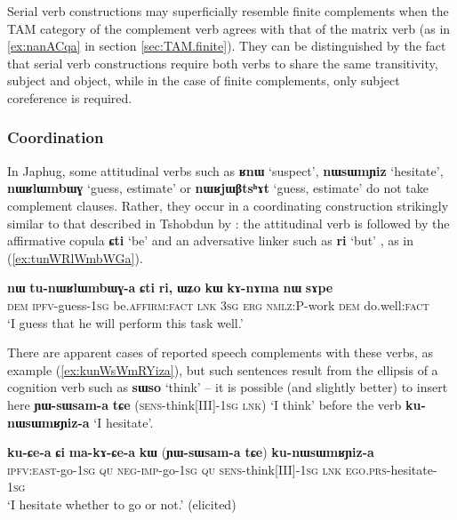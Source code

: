 \documentclass[oneside,a4paper,11pt]{article}
\newcommand{\ipa}[1]{\textbf{\phon#1}} %
\newcommand{\jpg}[2]{\ipa{#1} `#2'} %
\begin{document}
Serial verb constructions may superficially resemble finite complements when the TAM category of the complement verb agrees with that of the matrix verb (as in \ref{ex:nanACqa} in section \ref{sec:TAM.finite}). They can be distinguished by the fact that serial verb constructions require both verbs to share the same transitivity, subject and object, while in the case of finite complements, only subject coreference is required.

\subsubsection{Coordination}
In Japhug, some attitudinal verbs such as \jpg{ʁnɯ}{suspect}, \jpg{nɯsɯmɲiz}{hesitate}, \jpg{nɯʁlɯmbɯɣ}{guess, estimate} or \jpg{nɯʁjɯβtsʰɤt}{guess, estimate} do not take complement clauses. Rather, they occur in a coordinating construction strikingly similar to that described in Tshobdun  by \citet[487-8]{sun12complementation}: the attitudinal verb is followed by the affirmative copula \jpg{ɕti}{be} and an adversative linker such as \jpg{ri}{but} , as in (\ref{ex:tunWRlWmbWGa}).

\begin{exe}
\ex \label{ex:tunWRlWmbWGa}
\gll \ipa{nɯ} 	\ipa{tu-nɯʁlɯmbɯɣ-a} 	\ipa{ɕti} 	\ipa{ri,} 	\ipa{ɯʑo} 	\ipa{kɯ} 	\ipa{kɤ-nɤma} 	\ipa{nɯ} 	\ipa{sɤpe} \\
\textsc{dem} \textsc{ipfv}-guess-\textsc{1sg} be.\textsc{affirm:fact} \textsc{lnk} \textsc{3sg} \textsc{erg} \textsc{nmlz:P}-work \textsc{dem} do.well:\textsc{fact} \\
\glt `I guess that he will perform this task well.'
\end{exe}

There are apparent cases of reported speech complements with these verbs, as example (\ref{ex:kunWsWmRYiza}), but such sentences result from the ellipsis of a cognition verb such as \jpg{sɯso}{think} -- it is possible (and slightly better) to insert here \ipa{ɲɯ-sɯsam-a} 	\ipa{tɕe} (\textsc{sens}-think[III]-\textsc{1sg} \textsc{lnk}) `I think' before the verb \ipa{ku-nɯsɯmʁɲiz-a}  `I hesitate'.

\begin{exe}
\ex \label{ex:kunWsWmRYiza}
\gll 
\ipa{ku-ɕe-a} 	\ipa{ɕi} 	\ipa{ma-kɤ-ɕe-a} 	\ipa{kɯ} (\ipa{ɲɯ-sɯsam-a} 	\ipa{tɕe}) \ipa{ku-nɯsɯmʁɲiz-a} \\
\textsc{ipfv:east}-go-\textsc{1sg} \textsc{qu} \textsc{neg-imp}-go-\textsc{1sg} \textsc{qu} \textsc{sens}-think[III]-\textsc{1sg} \textsc{lnk} \textsc{ego.prs}-hesitate-\textsc{1sg} \\
\glt `I hesitate whether to go or not.' (elicited)
\end{exe}
\end{document}
